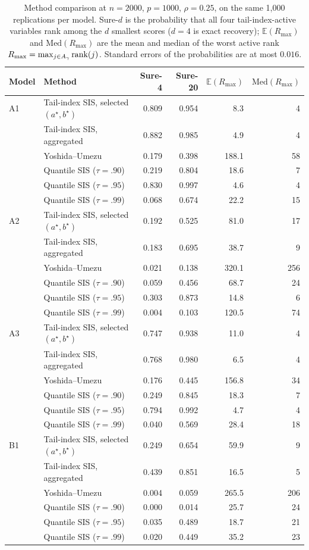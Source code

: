 \begin{table}[t]
\centering
\caption{Method comparison at $n=2000$, $p=1000$, $\rho=0.25$, on the same 1{,}000 replications per model. Sure-$d$ is the probability that all four tail-index-active variables rank among the $d$ smallest scores ($d=4$ is exact recovery); $\mathbb{E}(R_{\max})$ and $\mathrm{Med}(R_{\max})$ are the mean and median of the worst active rank $R_{\max}=\max_{j\in A_\gamma}\mathrm{rank}(j)$. Standard errors of the probabilities are at most $0.016$.}
\label{tab:cmp1000}
\begin{tabular}{llrrrr}
\toprule
Model & Method & Sure-4 & Sure-20 & $\mathbb{E}(R_{\max})$ & $\mathrm{Med}(R_{\max})$\\
\midrule
A1 & Tail-index SIS, selected $(a^\star,b^\star)$ & 0.809 & 0.954 & 8.3 & 4\\
 & Tail-index SIS, aggregated & 0.882 & 0.985 & 4.9 & 4\\
 & Yoshida--Umezu & 0.179 & 0.398 & 188.1 & 58\\
 & Quantile SIS ($\tau=.90$) & 0.219 & 0.804 & 18.6 & 7\\
 & Quantile SIS ($\tau=.95$) & 0.830 & 0.997 & 4.6 & 4\\
 & Quantile SIS ($\tau=.99$) & 0.068 & 0.674 & 22.2 & 15\\
\addlinespace
A2 & Tail-index SIS, selected $(a^\star,b^\star)$ & 0.192 & 0.525 & 81.0 & 17\\
 & Tail-index SIS, aggregated & 0.183 & 0.695 & 38.7 & 9\\
 & Yoshida--Umezu & 0.021 & 0.138 & 320.1 & 256\\
 & Quantile SIS ($\tau=.90$) & 0.059 & 0.456 & 68.7 & 24\\
 & Quantile SIS ($\tau=.95$) & 0.303 & 0.873 & 14.8 & 6\\
 & Quantile SIS ($\tau=.99$) & 0.004 & 0.103 & 120.5 & 74\\
\addlinespace
A3 & Tail-index SIS, selected $(a^\star,b^\star)$ & 0.747 & 0.938 & 11.0 & 4\\
 & Tail-index SIS, aggregated & 0.768 & 0.980 & 6.5 & 4\\
 & Yoshida--Umezu & 0.176 & 0.445 & 156.8 & 34\\
 & Quantile SIS ($\tau=.90$) & 0.249 & 0.845 & 18.3 & 7\\
 & Quantile SIS ($\tau=.95$) & 0.794 & 0.992 & 4.7 & 4\\
 & Quantile SIS ($\tau=.99$) & 0.040 & 0.569 & 28.4 & 18\\
\addlinespace
B1 & Tail-index SIS, selected $(a^\star,b^\star)$ & 0.249 & 0.654 & 59.9 & 9\\
 & Tail-index SIS, aggregated & 0.439 & 0.851 & 16.5 & 5\\
 & Yoshida--Umezu & 0.004 & 0.059 & 265.5 & 206\\
 & Quantile SIS ($\tau=.90$) & 0.000 & 0.014 & 25.7 & 24\\
 & Quantile SIS ($\tau=.95$) & 0.035 & 0.489 & 18.7 & 21\\
 & Quantile SIS ($\tau=.99$) & 0.020 & 0.449 & 35.2 & 23\\
\bottomrule
\end{tabular}
\end{table}
